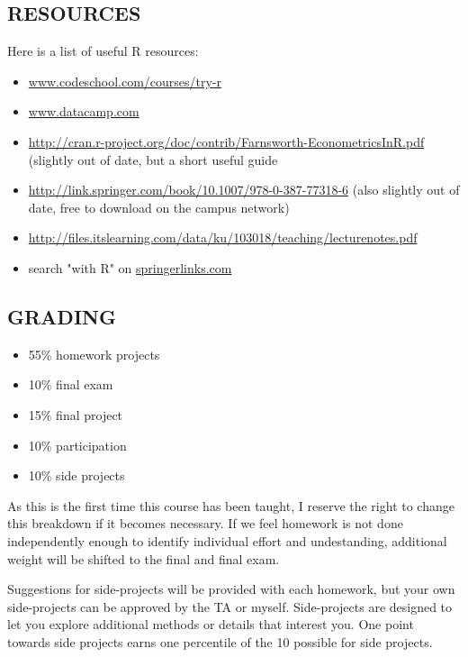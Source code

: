 \documentclass{scrartcl}
\begin{document}
\subsection*{RESOURCES}

Here is a list of useful R resources:
\begin{itemize}
\item \href{www.codeschool.com/courses/try-r}{www.codeschool.com/courses/try-r}
\item \href{www.datacamp.com}{www.datacamp.com}
\item \href{http://cran.r-project.org/doc/contrib/Farnsworth-EconometricsInR.pdf}{http://cran.r-project.org/doc/contrib/Farnsworth-EconometricsInR.pdf} (slightly out of date, but a short useful guide
\item \href{http://link.springer.com/book/10.1007/978-0-387-77318-6}{http://link.springer.com/book/10.1007/978-0-387-77318-6} (also slightly out of date, free to download on the campus network)
\item \href{http://files.itslearning.com/data/ku/103018/teaching/lecturenotes.pdf}{http://files.itslearning.com/data/ku/103018/teaching/lecturenotes.pdf}
\item search "with R" on \href{springerlinks.com}{springerlinks.com}
\end{itemize}

\subsection*{GRADING}
\begin{itemize}
\item 55\% homework projects
\item 10\% final exam
\item 15\% final project
\item 10\% participation 
\item 10\% side projects
\end{itemize}

As this is the first time this course has been taught, I reserve the right to change this breakdown if it becomes necessary. If we feel homework is not done independently enough to identify individual effort and undestanding, additional weight will be shifted to the final and final exam.

Suggestions for side-projects will be provided with each homework, but your own side-projects can be approved by the TA or myself. Side-projects are designed to let you explore additional methods or details that interest you. One point towards side projects earns one percentile of the 10 possible for side projects.
\end{document}
